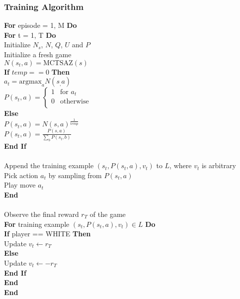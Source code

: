 \documentclass{article}
\begin{document}
\pagebreak
\subsubsection{Training Algorithm}
\textbf{For} episode = 1, M \textbf{Do} \\
\indent \textbf{For} t = 1, T \textbf{Do} \\
\indent \indent Initialize $N_s$, $N$, $Q$, $U$ and $P$ \\
\indent \indent Initialize a fresh game \\
\indent \indent $N(s_t,a) = \text{MCTSAZ}(s)$ \\
\indent \indent \textbf{If} $temp == 0$ \textbf{Then} \\
\indent \indent \indent $a_t = \text{argmax}_a N(s_,a)$ \\
\indent \indent \indent $P(s_t,a) = 
\begin{cases}
	1		& \text{for } a_t \\
	0    	& \text{otherwise} \\
\end{cases}
$ \\
\indent \indent \textbf{Else} \\
\indent \indent \indent $P(s_t,a) = N(s,a)^{\frac{1}{temp}}$ \\
\indent \indent \indent $P(s_t,a) = \frac{P(s,a)}{\sum\nolimits_{b}P(s_t,b)}$ \\
\indent \indent \textbf{End If} \\
\\
\indent \indent Append the training example $(s_t, P(s_t,a), v_t)$ to $L$, where $v_t$ is arbitrary \\
\indent \indent Pick action $a_t$ by sampling from $P(s_t,a)$ \\
\indent \indent Play move $a_t$ \\
\indent \textbf{End} \\
\\
\indent Observe the final reward $r_T$ of the game \\
\indent \textbf{For} training example $(s_t, P(s_t,a), v_t) \in L$ \textbf{Do} \\
\indent \indent \textbf{If} player == WHITE \textbf{Then} \\
\indent \indent \indent Update $v_t \leftarrow r_T$ \\
\indent \indent \textbf{Else} \\
\indent \indent \indent Update $v_t \leftarrow -r_T$ \\
\indent \indent \textbf{End If} \\
\indent \textbf{End} \\
\textbf{End} \\



\pagebreak
\end{document}
